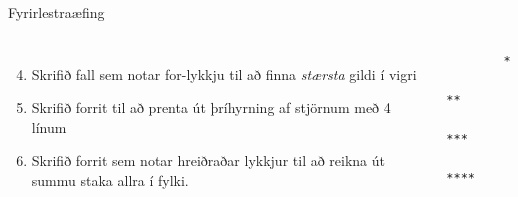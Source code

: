 \documentclass[handout]{beamer}
\begin{document}
\begin{frame}[fragile]{Fyrirlestraæfing}
    \begin{columns}
        \begin{enumerate}
            \setcounter{enumi}{3}
            \item Skrifið fall sem notar for-lykkju til að finna \emph{stærsta} gildi í vigri
            \item Skrifið forrit til að prenta út þríhyrning
            af stjörnum með 4 línum
            \item Skrifið forrit sem notar hreiðraðar lykkjur til að reikna út summu staka allra í fylki.
        \end{enumerate}
        \begin{verbatim}
        *
        **
        ***
        ****
        \end{verbatim}
    \end{columns}
\end{frame}
\end{document}
